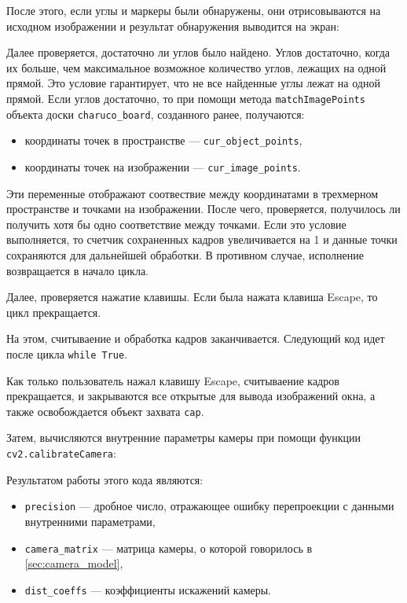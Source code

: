 \documentclass[12pt, a4paper]{article}
\begin{document}
После этого, если углы и маркеры были обнаружены, они отрисовываются на
исходном изображении и результат обнаружения выводится на экран:

Далее проверяется, достаточно ли углов было найдено. 
Углов достаточно, когда их больше, чем максимальное возможное количество углов,
лежащих на одной прямой. Это условие гарантирует, что не все найденные углы
лежат на одной прямой. Если углов достаточно, то при помощи метода
\texttt{matchImagePoints} объекта доски \texttt{charuco\_board}, созданного
ранее, получаются:
\begin{itemize}
  \item координаты точек в пространстве --- \texttt{cur\_object\_points}, 
  \item координаты точек на изображении --- \texttt{cur\_image\_points}.
\end{itemize}
Эти переменные отображают соотвествие между координатами в трехмерном
пространстве и точками на изображении.
После чего, проверяется, получилось ли получить хотя бы одно соответствие между
точками. Если это условие выполняется, то счетчик сохраненных кадров
увеличивается на 1 и данные точки сохраняются для дальнейшей обработки. В
противном случае, исполнение возвращается в начало цикла.

Далее, проверяется нажатие клавишы. Если была нажата клавиша Escape, то цикл прекращается.

На этом, считываение и обработка кадров заканчивается. Следующий код идет после цикла \texttt{while True}.

Как только пользователь нажал клавишу Escape, считываение кадров прекращается,
и закрываются все открытые для вывода изображений окна, а также освобождается
объект захвата \texttt{cap}.

Затем, вычисляются внутренние параметры камеры при помощи функции\\
\texttt{cv2.calibrateCamera}:


Результатом работы этого кода являются:
\begin{itemize}
  \item \texttt{precision} --- дробное число, отражающее ошибку перепроекции с данными внутренними параметрами,
  \item \texttt{camera\_matrix} --- матрица камеры, о которой говорилось в \ref{sec:camera_model},
  \item \texttt{dist\_coeffs} --- коэффициенты искажений камеры.
\end{itemize}
\end{document}
